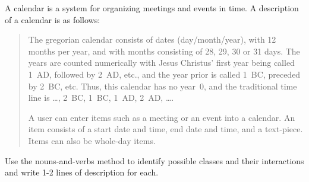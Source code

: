 A calendar is a system for organizing meetings and events in time. A description of a calendar is as follows:
\begin{quote}
  The gregorian calendar consists of dates (day/month/year), with 12 months per year, and with months consisting of 28, 29, 30 or 31 days. The years are counted numerically with Jesus Christus' first year being called 1~AD, followed by 2~AD, etc., and the year prior is called 1~BC, preceded by 2~BC, etc. Thus, this calendar has no year~0, and the traditional time line is \ldots, 2~BC, 1~BC, 1~AD, 2~AD, \ldots.

  A user can enter items such as a meeting or an event into a calendar. An item consists of a start date and time, end date and time, and a text-piece. Items can also be whole-day items.
\end{quote}
Use the nouns-and-verbs method to identify possible classes and their interactions and write 1-2 lines of description for each.
